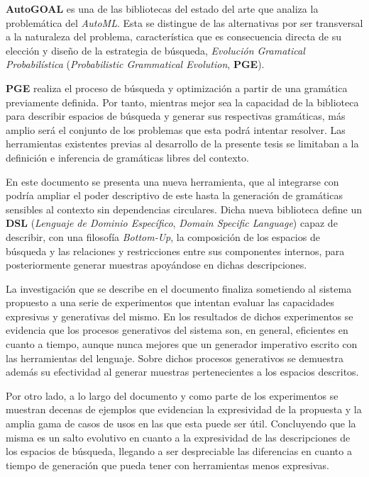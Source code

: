 \begin{resumen}
  {\bf AutoGOAL} es una de las bibliotecas del estado del arte que analiza la
  problemática del {\it AutoML}. Esta se distingue de las alternativas por ser transversal
  a la naturaleza del problema, característica que es consecuencia directa
  de su elección y diseño de la estrategia de búsqueda,
  {\it Evolución Gramatical Probabilística}
  ({\it Probabilistic Grammatical Evolution}, {\bf PGE}).

    {\bf PGE} realiza el proceso de búsqueda y optimización a partir de una
  gramática previamente definida. Por tanto, mientras mejor sea la
  capacidad de la biblioteca para describir espacios de búsqueda y generar
  sus respectivas gramáticas, más amplio será el conjunto de los problemas
  que esta podrá intentar resolver. Las herramientas existentes previas al
  desarrollo de la presente tesis se limitaban a la definición e inferencia
  de gramáticas libres del contexto.

  En este documento se presenta una nueva herramienta, que al integrarse con
   podría ampliar el poder descriptivo de este hasta la
  generación de gramáticas sensibles al contexto sin dependencias circulares.
  Dicha nueva biblioteca define un {\bf DSL}
  ({\it Lenguaje de Dominio Específico}, {\it Domain Specific Language}) capaz de
  describir, con una filosofía {\it Bottom-Up}, la composición de los
  espacios de búsqueda y las relaciones y restricciones entre sus
  componentes internos, para posteriormente generar muestras apoyándose en
  dichas descripciones.

  La investigación que se describe en el documento finaliza sometiendo al 
  sistema propuesto a una serie de experimentos que intentan evaluar las 
  capacidades expresivas y generativas del mismo. En los resultados de dichos 
  experimentos se evidencia que los procesos generativos del sistema son, en 
  general, eficientes en cuanto a tiempo, aunque nunca mejores que un generador 
  imperativo escrito con las herramientas del lenguaje. Sobre dichos procesos generativos se 
  demuestra además su efectividad al generar muestras pertenecientes a los 
  espacios descritos. 

  Por otro lado, a lo largo del documento y como parte de los 
  experimentos se muestran decenas de ejemplos que evidencian la expresividad de 
  la propuesta y la amplia gama de casos de usos en las que esta puede ser útil. 
  Concluyendo que la misma es un salto evolutivo en cuanto a la expresividad de 
  las descripciones de los espacios de búsqueda, llegando a ser despreciable las 
  diferencias en cuanto a tiempo de generación que pueda tener con herramientas menos expresivas.

\end{resumen}

